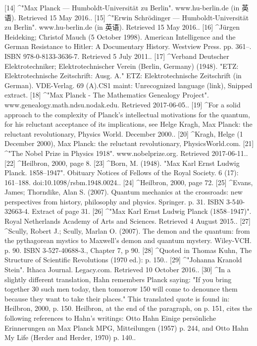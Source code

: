 [14]
^"Max Planck — Humboldt-Universität zu Berlin". www.hu-berlin.de (in 英语). Retrieved 15 May 2016..
[15]
^"Erwin Schrödinger — Humboldt-Universität zu Berlin". www.hu-berlin.de (in 英语). Retrieved 15 May 2016..
[16]
^Jürgen Heideking; Christof Mauch (5 October 1998). American Intelligence and the German Resistance to Hitler: A Documentary History. Westview Press. pp. 361–. ISBN 978-0-8133-3636-7. Retrieved 5 July 2011..
[17]
^Verband Deutscher Elektrotechniker; Elektrotechnischer Verein (Berlin, Germany) (1948). "ETZ: Elektrotechnische Zeitschrift: Ausg. A." ETZ: Elektrotechnische Zeitschrift (in German). VDE-Verlag. 69 (A).CS1 maint: Unrecognized language (link), Snipped extract.
[18]
^"Max Planck - The Mathematics Genealogy Project". www.genealogy.math.ndsu.nodak.edu. Retrieved 2017-06-05..
[19]
^For a solid approach to the complexity of Planck's intellectual motivations for the quantum, for his reluctant acceptance of its implications, see Helge Kragh, Max Planck: the reluctant revolutionary, Physics World. December 2000..
[20]
^Kragh, Helge (1 December 2000), Max Planck: the reluctant revolutionary, PhysicsWorld.com.
[21]
^"The Nobel Prize in Physics 1918". www.nobelprize.org. Retrieved 2017-06-11..
[22]
^Heilbron, 2000, page 8.
[23]
^Born, M. (1948). "Max Karl Ernst Ludwig Planck. 1858–1947". Obituary Notices of Fellows of the Royal Society. 6 (17): 161–188. doi:10.1098/rsbm.1948.0024..
[24]
^Heilbron, 2000, page 72.
[25]
^Evans, James; Thorndike, Alan S. (2007). Quantum mechanics at the crossroads: new perspectives from history, philosophy and physics. Springer. p. 31. ISBN 3-540-32663-4. Extract of page 31.
[26]
^"Max Karl Ernst Ludwig Planck (1858–1947)". Royal Netherlands Academy of Arts and Sciences. Retrieved 4 August 2015..
[27]
^Scully, Robert J.; Scully, Marlan O. (2007). The demon and the quantum: from the pythagorean mystics to Maxwell's demon and quantum mystery. Wiley-VCH. p. 90. ISBN 3-527-40688-3., Chapter 7, p 90.
[28]
^Quoted in Thomas Kuhn, The Structure of Scientific Revolutions (1970 ed.): p. 150..
[29]
^"Johanna Kranold Stein". Ithaca Journal. Legacy.com. Retrieved 10 October 2016..
[30]
^In a slightly different translation, Hahn remembers Planck saying: "If you bring together 30 such men today, then tomorrow 150 will come to denounce them because they want to take their places." This translated quote is found in: Heilbron, 2000, p. 150. Heilbron, at the end of the paragraph, on p. 151, cites the following references to Hahn’s writings: Otto Hahn Einige persönliche Erinnerungen an Max Planck MPG, Mitteilungen (1957) p. 244, and Otto Hahn My Life (Herder and Herder, 1970) p. 140..
